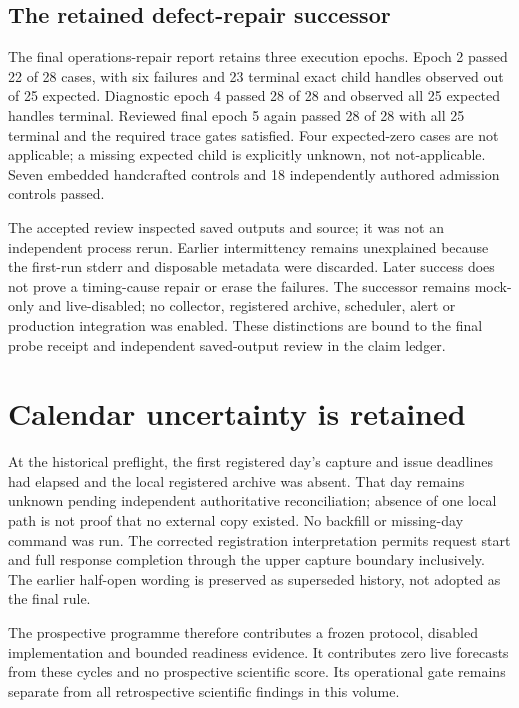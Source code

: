 \subsection{The retained defect-repair successor}

The final operations-repair report retains three execution epochs. Epoch 2 passed 22 of 28 cases, with six failures and 23 terminal exact child handles observed out of 25 expected. Diagnostic epoch 4 passed 28 of 28 and observed all 25 expected handles terminal. Reviewed final epoch 5 again passed 28 of 28 with all 25 terminal and the required trace gates satisfied. Four expected-zero cases are not applicable; a missing expected child is explicitly unknown, not not-applicable. Seven embedded handcrafted controls and 18 independently authored admission controls passed.

The accepted review inspected saved outputs and source; it was not an independent process rerun. Earlier intermittency remains unexplained because the first-run stderr and disposable metadata were discarded. Later success does not prove a timing-cause repair or erase the failures. The successor remains mock-only and live-disabled; no collector, registered archive, scheduler, alert or production integration was enabled. These distinctions are bound to the final probe receipt and independent saved-output review in the claim ledger.

\section{Calendar uncertainty is retained}

At the historical preflight, the first registered day's capture and issue deadlines had elapsed and the local registered archive was absent. That day remains unknown pending independent authoritative reconciliation; absence of one local path is not proof that no external copy existed. No backfill or missing-day command was run. The corrected registration interpretation permits request start and full response completion through the upper capture boundary inclusively. The earlier half-open wording is preserved as superseded history, not adopted as the final rule.

The prospective programme therefore contributes a frozen protocol, disabled implementation and bounded readiness evidence. It contributes zero live forecasts from these cycles and no prospective scientific score. Its operational gate remains separate from all retrospective scientific findings in this volume.
